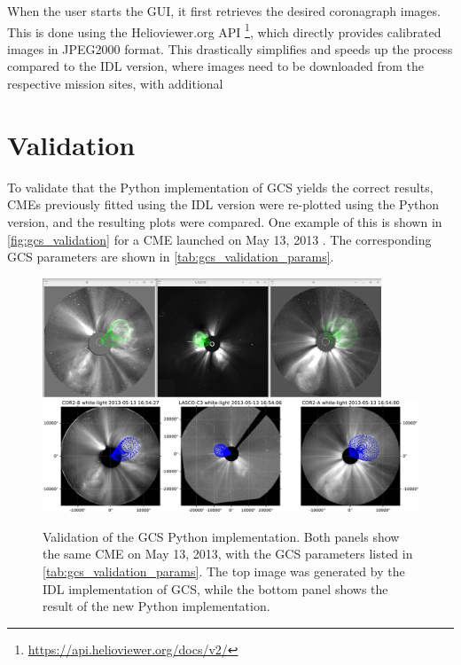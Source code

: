 When the user starts the GUI, it first retrieves the desired coronagraph images. This is done using the Helioviewer.org API \footnote{\url{https://api.helioviewer.org/docs/v2/}}, which directly provides calibrated images in JPEG2000 format. This drastically simplifies and speeds up the process compared to the IDL version, where images need to be downloaded from the respective mission sites, with additional


\section{Validation}

To validate that the Python implementation of GCS yields the correct results, CMEs previously fitted using the IDL version were re-plotted using the Python version, and the resulting plots were compared. One example of this is shown in \autoref{fig:gcs_validation} for a CME launched on May 13, 2013 \citep[originally reconstructed by][Figure 2]{Gou-2020}. The corresponding GCS parameters are shown in \autoref{tab:gcs_validation_params}.

\begin{figure}
	\centering
	\includegraphics[width=0.9\textwidth]{images/gcs_validation_20130513_idl.png}\\[5mm]
	\includegraphics[width=\textwidth]{images/gcs_validation_20130513_python.pdf}
	\caption[Validation of the GCS Python implementation]{Validation of the GCS Python implementation. Both panels show the same CME on May 13, 2013, with the GCS parameters listed in \autoref{tab:gcs_validation_params}. The top image was generated by the IDL implementation of GCS, while the bottom panel shows the result of the new Python implementation.}
	\label{fig:gcs_validation}
\end{figure}

